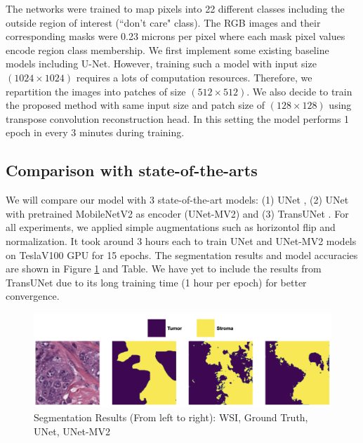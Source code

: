 \documentclass[review]{cvpr}
\begin{document}
The networks were trained to map pixels into 22 different classes including the outside region of interest (``don't care" class). The RGB images and their corresponding masks were 0.23 microns per pixel where each mask pixel values encode region class membership. We first implement some existing baseline models including U-Net. However, training such a model with input size $(1024 \times 1024)$ requires a lots of computation resources. Therefore, we repartition the images into patches of size $(512\times 512)$. We also decide to train the proposed method with same input size and patch size of $(128\times 128)$ using transpose convolution reconstruction head. In this setting the model performs 1 epoch in every 3 minutes during training. 

\subsection{Comparison with state-of-the-arts}
We will compare our model with 3 state-of-the-art models: (1) UNet \cite{ronneberger2015unet}, (2) UNet with pretrained MobileNetV2 as encoder (UNet-MV2) and (3) TransUNet \cite{chen2021transunet}. For all experiments, we applied simple augmentations such as horizontol flip and normalization. It took around 3 hours each to train UNet and UNet-MV2 models on TeslaV100 GPU for 15 epochs. The segmentation results and model accuracies are shown in Figure \ref{fig:seg} and Table. We have yet to include the results from TransUNet due to its long training time (1 hour per epoch) for better convergence.

\begin{figure}[ht]
\begin{center}
   \includegraphics[width=0.9\linewidth]{media/Compare.png}
\end{center}
   \caption{Segmentation Results (From left to right): WSI, Ground Truth, UNet, UNet-MV2}
\label{fig:seg}
\end{figure}
\end{document}
